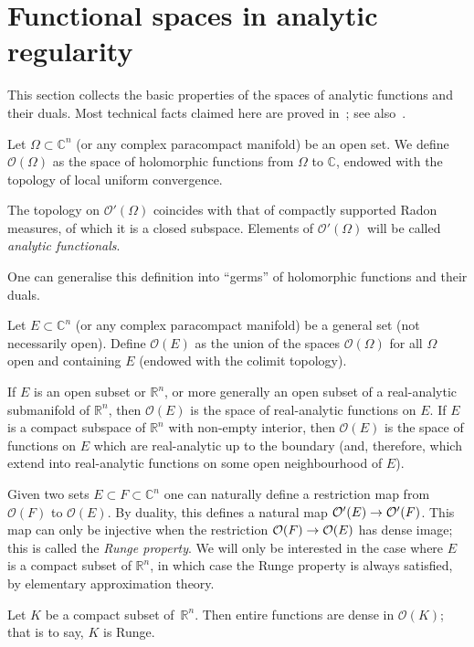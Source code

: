 \documentclass[AHL,Unicode,longabstracts,published]{cedram}
\newcommand{\clO}{\mathcal{O}}
\newcommand\1{\mathds{1}}
\newcommand{\R}{\mathbb{R}}
\newcommand{\C}{\mathbb{C}}
\renewcommand*{\to}{\mathchoice{\longrightarrow}{\rightarrow}{\rightarrow}{\rightarrow}}
\begin{document}
\section{Functional spaces in analytic regularity}\label{sec:funct-spac-analyt}

This section collects the basic properties of the spaces of analytic functions and their duals. Most technical facts claimed here are proved in~\cite{hormander_introduction_1973}; see also~\cite[Chapter~6]{treves_analytic_2022}.

\begin{defi}\label{def:space_hol_func}
Let $\Omega\subset \C^n$ (or any complex paracompact manifold) be an open set. We define $\clO(\Omega)$ as the space of holomorphic functions from $\Omega$ to $\C$, endowed with the topology of local uniform convergence.
\end{defi} The topology on $\clO'(\Omega)$ coincides with that of compactly supported Radon measures, of which it is a closed subspace. Elements of $\clO'(\Omega)$ will be called \emph{analytic functionals}.

One can generalise this definition into ``germs'' of holomorphic functions and their duals.

\begin{defi}
Let $E\subset \C^n$ (or any complex paracompact manifold) be a general set (not necessarily open). Define $\clO(E)$ as the union of the spaces $\clO(\Omega)$ for all $\Omega$ open and containing $E$ (endowed with the colimit topology).
\end{defi} If $E$ is an open subset or $\R^n$, or more generally an open subset of a real-analytic submanifold of $\R^n$, then $\clO(E)$ is the space of real-analytic functions on $E$. If $E$ is a compact subspace of $\R^n$ with non-empty interior, then $\clO(E)$ is the space of functions on $E$ which are real-analytic up to the boundary (and, therefore, which extend into real-analytic functions on some open neighbourhood of $E$).

Given two sets $E\subset F\subset \C^n$ one can naturally define a restriction map from $\clO(F)$ to $\clO(E)$. By duality, this defines a natural map $\clO'(E)\to \clO'(F)$. This map can only be injective when the restriction $\clO(F)\to \clO(E)$ has dense image; this is called the \emph{Runge property}. We will only be interested in the case where $E$ is a compact subset of $\R^n$, in which case the Runge property is always satisfied, by elementary approximation theory.

\begin{prop}
\label{prop:real_cpts_are_Runge}
Let $K$ be a compact subset of~$\R^n$. Then entire functions are dense in $\clO(K)$; that is to say, $K$ is Runge.
\end{prop}
\end{document}
